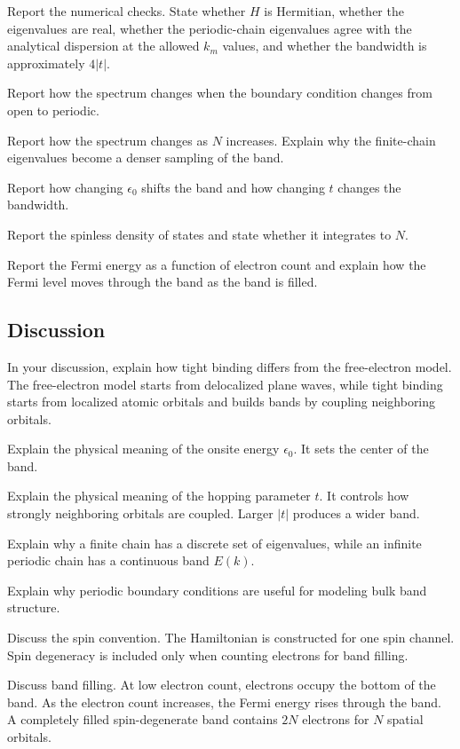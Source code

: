 Report the numerical checks. State whether \(H\) is Hermitian, whether the eigenvalues are real, whether the periodic-chain eigenvalues agree with the analytical dispersion at the allowed \(k_m\) values, and whether the bandwidth is approximately \(4|t|\).

Report how the spectrum changes when the boundary condition changes from open to periodic.

Report how the spectrum changes as \(N\) increases. Explain why the finite-chain eigenvalues become a denser sampling of the band.

Report how changing \(\epsilon_0\) shifts the band and how changing \(t\) changes the bandwidth.

Report the spinless density of states and state whether it integrates to \(N\).

Report the Fermi energy as a function of electron count and explain how the Fermi level moves through the band as the band is filled.

\subsection{Discussion}

In your discussion, explain how tight binding differs from the free-electron model. The free-electron model starts from delocalized plane waves, while tight binding starts from localized atomic orbitals and builds bands by coupling neighboring orbitals.

Explain the physical meaning of the onsite energy \(\epsilon_0\). It sets the center of the band.

Explain the physical meaning of the hopping parameter \(t\). It controls how strongly neighboring orbitals are coupled. Larger \(|t|\) produces a wider band.

Explain why a finite chain has a discrete set of eigenvalues, while an infinite periodic chain has a continuous band \(E(k)\).

Explain why periodic boundary conditions are useful for modeling bulk band structure.

Discuss the spin convention. The Hamiltonian is constructed for one spin channel. Spin degeneracy is included only when counting electrons for band filling.

Discuss band filling. At low electron count, electrons occupy the bottom of the band. As the electron count increases, the Fermi energy rises through the band. A completely filled spin-degenerate band contains \(2N\) electrons for \(N\) spatial orbitals.

